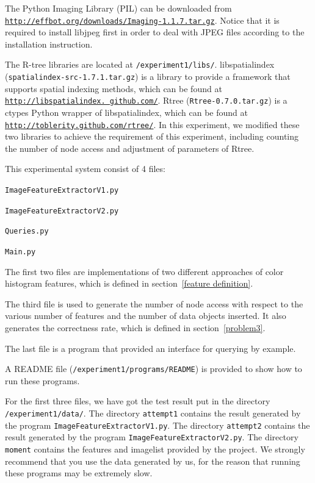 \documentclass{acm_proc_article-sp}
\begin{document}
The Python Imaging Library (PIL)\cite{website:PIL} can be downloaded from \texttt{\url{http://effbot.org/downloads/Imaging-1.1.7.tar.gz}}. Notice that it is required to install libjpeg first in order to deal with JPEG files according to the installation instruction.

The R-tree libraries are located at \texttt{/experiment1/libs/}. libspatialindex (\texttt{spatialindex-src-1.7.1.tar.gz})\cite{website:si} is a library to provide a framework that supports spatial indexing methods, which can be found at \texttt{\href{http://libspatialindex.github.com/}{http://libspatialindex. github.com/}}. Rtree (\texttt{Rtree-0.7.0.tar.gz})\cite{website:rtree} is a ctypes Python wrapper of libspatialindex, which can be found at \texttt{\url{http://toblerity.github.com/rtree/}}. In this experiment, we modified these two libraries to achieve the requirement of this experiment, including counting the number of node access and adjustment of parameters of Rtree.

This experimental system consist of 4 files:

\begin{itemize*}
  \item \texttt{ImageFeatureExtractorV1.py}
  \item \texttt{ImageFeatureExtractorV2.py}
  \item \texttt{Queries.py}
  \item \texttt{Main.py}
\end{itemize*}

The first two files are implementations of two different approaches of color histogram features, which is defined in section~\ref{feature definition}.

The third file is used to generate the number of node access with respect to the various number of features and the number of data objects inserted. It also generates the correctness rate, which is defined in section~\ref{problem3}.

The last file is a program that provided an interface for querying by example.

A README file (\texttt{/experiment1/programs/README}) is provided to show how to run these programs.

For the first three files, we have got the test result put in the directory \texttt{/experiment1/data/}. The directory \texttt{attempt1} contains the result generated by the program \texttt{ImageFeatureExtractorV1.py}. The directory \texttt{attempt2} contains the result generated by the program \texttt{ImageFeatureExtractorV2.py}. The directory \texttt{moment} contains the features and imagelist provided by the project. We strongly recommend that you use the data generated by us, for the reason that running these programs may be extremely slow.
\end{document}
